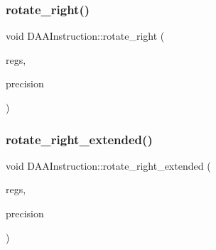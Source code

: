 \mbox{\label{classDAAInstruction_ac58387921102a26711f0ea67950d071d}} 
\subsubsection{\texorpdfstring{rotate\+\_\+right()}{rotate\_right()}}
{\footnotesize\ttfamily void D\+A\+A\+Instruction\+::rotate\+\_\+right (\begin{DoxyParamCaption}\item[{\hyperlink{DAAInstruction_8h_af0fae93a861de9cf37988d5673cac523}{reg\+Table} \&}]{regs,  }\item[{\hyperlink{DAAInstruction_8h_a0e8cae02815a5f8adc750122d790b455}{reg\+Precision\+Table} \&}]{precision }\end{DoxyParamCaption})}

\mbox{\label{classDAAInstruction_a68127dd0fdad592f7d1918e851f08c36}} 
\subsubsection{\texorpdfstring{rotate\+\_\+right\+\_\+extended()}{rotate\_right\_extended()}}
{\footnotesize\ttfamily void D\+A\+A\+Instruction\+::rotate\+\_\+right\+\_\+extended (\begin{DoxyParamCaption}\item[{\hyperlink{DAAInstruction_8h_af0fae93a861de9cf37988d5673cac523}{reg\+Table} \&}]{regs,  }\item[{\hyperlink{DAAInstruction_8h_a0e8cae02815a5f8adc750122d790b455}{reg\+Precision\+Table} \&}]{precision }\end{DoxyParamCaption})}

\mbox{\label{classDAAInstruction_a61d0b9bece1e0ead89a46c0197276324}} 
